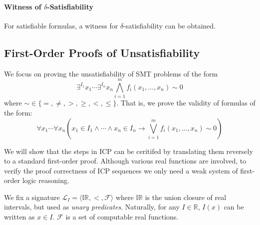 \documentclass[envcountsect]{llncs}
\begin{document}
\paragraph{Witness of $\delta$-Satisfiability}
For satisfiable formulas, a witness for $\delta$-satisfiability can be obtained. 


\subsection{First-Order Proofs of Unsatisfiability}

We focus on proving the unsatisfiability of SMT problems of the form
$$\exists^{I_1} x_1\cdots \exists^{I_n} x_n \bigwedge_{i=1}^m
f_i(x_1,...,x_n)\sim 0$$
where $\sim \in \{=,\neq, >, \geq, <, \leq\}$. That is, we prove the validity
of formulas of the form:
$$\forall x_1 \cdots \forall x_n (x_1\in I_1\wedge \cdots \wedge x_n\in I_n
\rightarrow \bigvee_{i=1}^m f_i(x_1,...,x_n)\sim 0)$$

We will show that the steps in ICP can be ceritifed by translating them
reversely to a standard first-order proof. Although various real functions are
involved, to verify the proof correctness of ICP sequences we only need a weak
system of first-order logic reasoning.  
\begin{definition}[Language]
We fix a signature $\mathcal{L}_I = \langle \mathbb{IR}, <, \mathcal{F} \rangle$ where $\mathbb{IR}$ is the union closure of real intervals, but used as {\em unary 
predicates}. Naturally, for any $I\in \mathbb{R}$, $I(x)$ can be written as
$x\in I$. $\mathcal{F}$ is a set of computable real functions. 
\end{definition}
\end{document}
